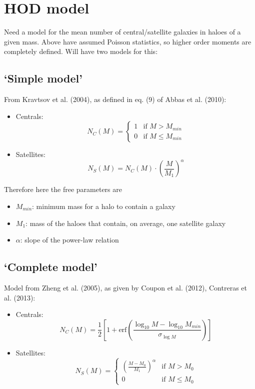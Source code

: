 \documentclass[10pt,a4paper]{article}
\begin{document}
\section{HOD model}

Need a model for the mean number of central/satellite galaxies in haloes of a given mass. Above have assumed Poisson statistics, so higher order moments are completely defined.
Will have two models for this:

\subsection{`Simple model'}
From Kravtsov et al. (2004), as defined in eq. (9) of Abbas et al. (2010):

\begin{itemize}
\item Centrals:
\begin{equation}
N_C(M) = \left\lbrace \begin{array}{ll}
1 & \mbox{if } M > M_{min} \\
0 & \mbox{if } M \leq M_{min}
\end{array}
\right.
\end{equation}
\item Satellites:
\begin{equation}
N_S(M) = N_C(M) \cdot \left( \frac{M}{M_1} \right)^{\alpha}
\end{equation}
\end{itemize}
Therefore here the free parameters are
\begin{itemize}
\item $M_{min}$: minimum mass for a halo to contain a galaxy
\item $M_1$: mass of the haloes that contain, on average, one satellite galaxy
\item $\alpha$: slope of the power-law relation
\end{itemize}

\subsection{`Complete model'}
Model from Zheng et al. (2005), as given by Coupon et al. (2012), Contreras et al. (2013):

\begin{itemize}
\item Centrals:
\begin{equation}
N_C(M) = \frac{1}{2}\left[ 1 + \mathrm{erf}\left(\frac{\log_{10} M - \log_{10}M_{min}}{\sigma_{\log M}} \right) \right]
\end{equation}
\item Satellites:
\begin{equation}
N_S(M) = \left\lbrace \begin{array}{ll}
\left(\frac{M - M_0}{M_1} \right)^{\alpha} & \mbox{if } M > M_0 \\
0 & \mbox{if } M \leq M_0
\end{array}\right.
\end{equation}
\end{itemize}
\end{document}
